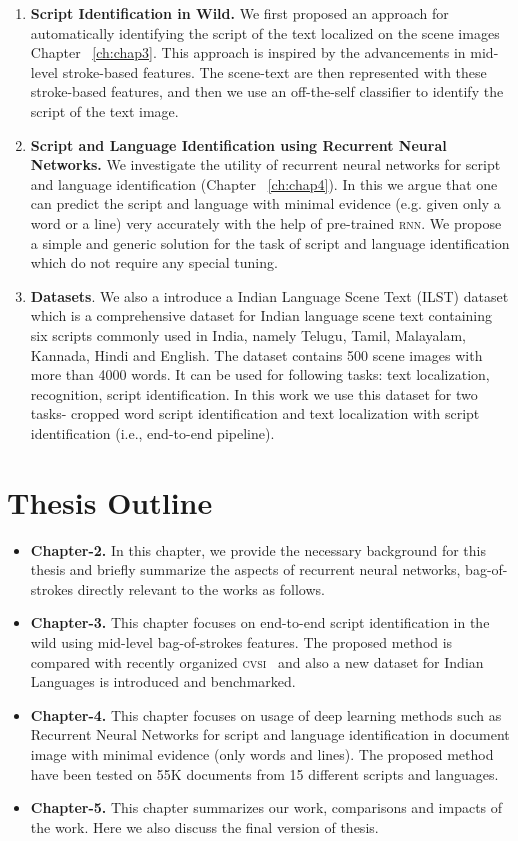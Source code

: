 \begin{enumerate}
\item \textbf{Script Identification in Wild.} We first proposed an approach for automatically identifying the script of the text localized on the scene images Chapter ~\ref{ch:chap3}. This approach is inspired by the advancements  in mid-level stroke-based features. The scene-text are then represented with these stroke-based features, and then we use an off-the-self classifier to identify the script of the text image.
\item \textbf{Script and Language Identification using Recurrent Neural Networks.} We investigate the utility of recurrent neural networks for script and language identification (Chapter ~\ref{ch:chap4}). In this we argue that one can predict the script and language with minimal evidence (e.g. given only a word or a line) very accurately with the help of pre-trained \textsc{rnn}. We propose a simple and generic solution for the task of script and language identification which do not require any special tuning.
\item \textbf{Datasets}. We also a introduce a Indian Language Scene Text (\textsc{ILST}) dataset which is a comprehensive dataset for Indian language scene text containing six scripts commonly used in India, namely Telugu, Tamil, Malayalam, Kannada, Hindi and English. The dataset contains 500 scene images with more than 4000 words. It can be used for following tasks: text localization, recognition, script identification. In this work we use this dataset for two tasks- cropped word script identification and text localization with script identification (i.e., end-to-end pipeline).
\end{enumerate}

\section{Thesis Outline}
\begin{itemize}
\item \textbf{Chapter-2.} In this chapter, we provide the necessary background for this thesis and briefly summarize the aspects of recurrent neural networks, bag-of-strokes directly relevant to the  works as follows.
\item \textbf{Chapter-3.} This chapter focuses on end-to-end script identification in the wild using mid-level bag-of-strokes features. The proposed method is compared with recently organized \textsc{cvsi}~\cite{ICDARcomp11} and also a new dataset for Indian Languages is introduced and benchmarked.
\item \textbf{Chapter-4.} This chapter focuses on usage of deep learning methods such as Recurrent Neural Networks for script and language identification in document image with minimal evidence (only words and lines). The proposed method have been tested on 55K documents from 15 different scripts and languages.
\item \textbf{Chapter-5.} This chapter summarizes our work, comparisons and impacts of the work. Here we also discuss the final version of thesis.
\end{itemize}

